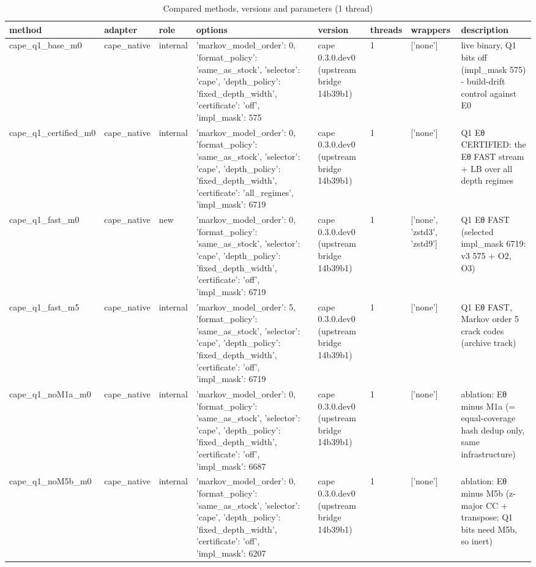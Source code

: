 \begin{table}[t]\centering\scriptsize
\caption{Compared methods, versions and parameters (1 thread)}\label{tab:T02}
\begin{tabular}{llllllll}
\hline
method & adapter & role & options & version & threads & wrappers & description \\ \hline
cape\_q1\_base\_m0 & cape\_native & internal & {'markov\_model\_order': 0, 'format\_policy': 'same\_as\_stock', 'selector': 'cape', 'depth\_policy': 'fixed\_depth\_width', 'certificate': 'off', 'impl\_mask': 575} & cape 0.3.0.dev0 (upstream bridge 14b39b1) & 1 & ['none'] & live binary, Q1 bits off (impl\_mask 575) - build-drift control against E0 \\
cape\_q1\_certified\_m0 & cape\_native & internal & {'markov\_model\_order': 0, 'format\_policy': 'same\_as\_stock', 'selector': 'cape', 'depth\_policy': 'fixed\_depth\_width', 'certificate': 'all\_regimes', 'impl\_mask': 6719} & cape 0.3.0.dev0 (upstream bridge 14b39b1) & 1 & ['none'] & Q1 Eθ CERTIFIED: the Eθ FAST stream + LB over all depth regimes \\
cape\_q1\_fast\_m0 & cape\_native & new & {'markov\_model\_order': 0, 'format\_policy': 'same\_as\_stock', 'selector': 'cape', 'depth\_policy': 'fixed\_depth\_width', 'certificate': 'off', 'impl\_mask': 6719} & cape 0.3.0.dev0 (upstream bridge 14b39b1) & 1 & ['none', 'zstd3', 'zstd9'] & Q1 Eθ FAST (selected impl\_mask 6719: v3 575 + O2, O3) \\
cape\_q1\_fast\_m5 & cape\_native & internal & {'markov\_model\_order': 5, 'format\_policy': 'same\_as\_stock', 'selector': 'cape', 'depth\_policy': 'fixed\_depth\_width', 'certificate': 'off', 'impl\_mask': 6719} & cape 0.3.0.dev0 (upstream bridge 14b39b1) & 1 & ['none'] & Q1 Eθ FAST, Markov order 5 crack codes (archive track) \\
cape\_q1\_noM1a\_m0 & cape\_native & internal & {'markov\_model\_order': 0, 'format\_policy': 'same\_as\_stock', 'selector': 'cape', 'depth\_policy': 'fixed\_depth\_width', 'certificate': 'off', 'impl\_mask': 6687} & cape 0.3.0.dev0 (upstream bridge 14b39b1) & 1 & ['none'] & ablation: Eθ minus M1a (= equal-coverage hash dedup only, same infrastructure) \\
cape\_q1\_noM5b\_m0 & cape\_native & internal & {'markov\_model\_order': 0, 'format\_policy': 'same\_as\_stock', 'selector': 'cape', 'depth\_policy': 'fixed\_depth\_width', 'certificate': 'off', 'impl\_mask': 6207} & cape 0.3.0.dev0 (upstream bridge 14b39b1) & 1 & ['none'] & ablation: Eθ minus M5b (z-major CC + transpose; Q1 bits need M5b, so inert) \\

\end{tabular}
\end{table}
